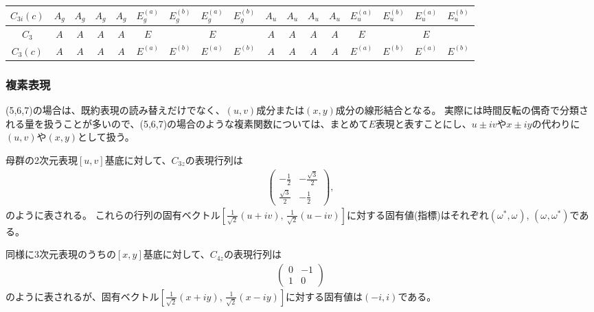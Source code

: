 \documentclass[11pt]{easymemo}
\begin{document}
\begin{landscape}
\begin{table}[ht!]
\begin{center}
\begin{tabular}{c||c|c|c|c|cc|cc||c|c|c|c|cc|cc}
$ C_{3i}(c) $ & $ A_{g} $ & $ A_{g} $ & $ A_{g} $ & $ A_{g} $ & $ E_{g}^{(a)} $ & $ E_{g}^{(b)} $ & $ E_{g}^{(a)} $ & $ E_{g}^{(b)} $ & $ A_{u} $ & $ A_{u} $ & $ A_{u} $ & $ A_{u} $ & $ E_{u}^{(a)} $ & $ E_{u}^{(b)} $ & $ E_{u}^{(a)} $ & $ E_{u}^{(b)} $ \\ \hline
$ C_{3} $ & $ A $ & $ A $ & $ A $ & $ A $ & $ E $ & & $ E $ & & $ A $ & $ A $ & $ A $ & $ A $ & $ E $ & & $ E $ & \\ \hline
$ C_{3}(c) $ & $ A $ & $ A $ & $ A $ & $ A $ & $ E^{(a)} $ & $ E^{(b)} $ & $ E^{(a)} $ & $ E^{(b)} $ & $ A $ & $ A $ & $ A $ & $ A $ & $ E^{(a)} $ & $ E^{(b)} $ & $ E^{(a)} $ & $ E^{(b)} $ \\
\hline\hline
\end{tabular}
\end{center}
\end{table}
\end{landscape}

\subsubsection{複素表現}

(5,6,7)の場合は、既約表現の読み替えだけでなく、$(u,v)$成分または$(x,y)$成分の線形結合となる。
実際には時間反転の偶奇で分類される量を扱うことが多いので、(5,6,7)の場合のような複素関数については、まとめて$E$表現と表すことにし、$u\pm iv$や$x\pm iy$の代わりに $(u,v)$や$(x,y)$として扱う。

母群の2次元表現$[u,v]$基底に対して、$C_{3z}$の表現行列は
\begin{align}
  \begin{pmatrix}
    -\frac{1}{2}       & -\frac{\sqrt{3}}{2} \\
    \frac{\sqrt{3}}{2} & -\frac{1}{2}
  \end{pmatrix},
\end{align}
のように表される。
これらの行列の固有ベクトル$[\frac{1}{\sqrt{2}}(u+iv),\,\frac{1}{\sqrt{2}}(u-iv)]$に対する固有値(指標)はそれぞれ$(\omega^{*},\omega^{})$, $(\omega^{},\omega^{*})$である。

同様に3次元表現のうちの$[x,y]$基底に対して、$C_{4z}$の表現行列は
\begin{align}
  \begin{pmatrix}
    0 & -1 \\
    1 & 0
  \end{pmatrix}
\end{align}
のように表されるが、固有ベクトル$[\frac{1}{\sqrt{2}}(x+iy),\,\frac{1}{\sqrt{2}}(x-iy)]$に対する固有値は$(-i,i)$である。
\end{document}
